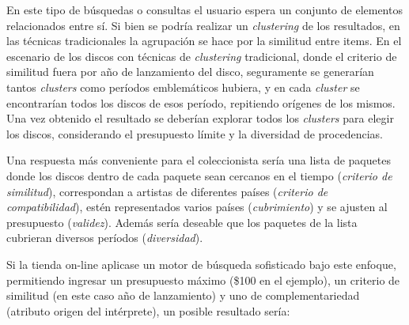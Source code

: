 En este tipo de búsquedas o consultas el usuario espera un conjunto de elementos relacionados entre sí. Si bien se podría realizar un {\em clustering} de los resultados, en las técnicas tradicionales la agrupación se hace por la similitud entre items. En el escenario de los discos con técnicas de {\em clustering} tradicional, donde el criterio de similitud fuera por año de lanzamiento del disco, seguramente se generarían tantos {\em clusters} como períodos emblemáticos hubiera, y en cada {\em cluster} se encontrarían todos los discos de esos período, repitiendo orígenes de los mismos. Una vez obtenido el resultado se deberían explorar todos los {\em clusters} para elegir los discos, considerando el presupuesto límite y la diversidad de procedencias.

Una respuesta más conveniente para el coleccionista sería una lista de paquetes donde los discos dentro de cada paquete sean cercanos en el tiempo ({\em criterio de similitud}), correspondan a artistas de diferentes países ({\em criterio de compatibilidad}), estén representados varios países ({\em cubrimiento}) y se ajusten al presupuesto ({\em validez}). Además sería deseable que los paquetes de la lista cubrieran diversos períodos ({\em diversidad}).

Si la tienda on-line aplicase un motor de búsqueda sofisticado bajo este enfoque, permitiendo ingresar un presupuesto máximo (\$100 en el ejemplo), un criterio de similitud (en este caso año de lanzamiento) y uno de complementariedad (atributo origen del intérprete), un posible resultado sería:

